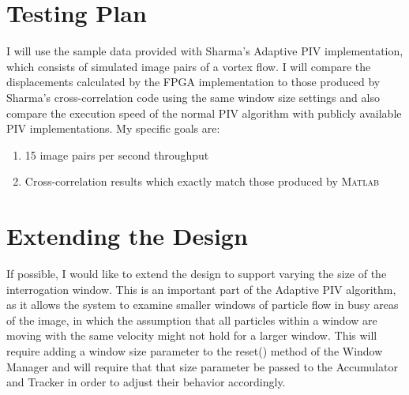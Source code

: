 \documentclass{article}
\begin{document}
\section{Testing Plan}
I will use the sample data provided with Sharma's Adaptive PIV implementation, which consists of simulated image pairs of a vortex flow. I will compare the displacements calculated by the FPGA implementation to those produced by Sharma's cross-correlation code using the same window size settings and also compare the execution speed of the normal PIV algorithm with publicly available PIV implementations. My specific goals are:
\begin{enumerate}
	\item 15 image pairs per second throughput
	\item Cross-correlation results which exactly match those produced by \textsc{Matlab}
\end{enumerate}

\section{Extending the Design}
If possible, I would like to extend the design to support varying the size of the interrogation window. This is an important part of the Adaptive PIV algorithm, as it allows the system to examine smaller windows of particle flow in busy areas of the image, in which the assumption that all particles within a window are moving with the same velocity might not hold for a larger window. This will require adding a window size parameter to the reset() method of the Window Manager and will require that that size parameter be passed to the Accumulator and Tracker in order to adjust their behavior accordingly. 

	
	
\end{document}

